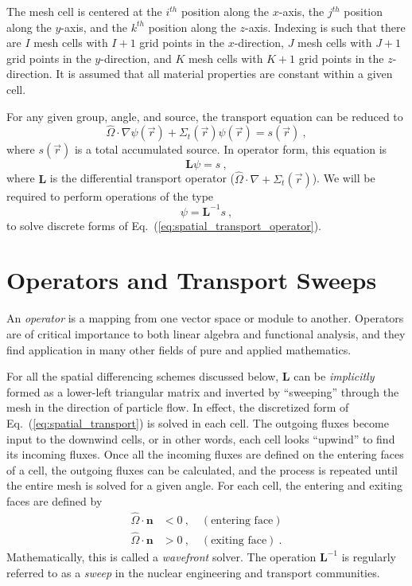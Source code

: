 \documentclass[12pt]{article}
\newcommand{\ve}[1]{\ensuremath{\mathbf{#1}}}
\newcommand{\vecr}{\ensuremath{\vec{r}}}
\newcommand{\vOmega}{\ensuremath{\hat{\Omega}}}
\begin{document}
The mesh cell is centered at the $i^{th}$ position along the $x$-axis, the $j^{th}$
position along the $y$-axis, and the  $k^{th}$ position along the $z$-axis. Indexing
is such that there are $I$ mesh cells with $I+1$ grid points in the $x$-direction, $J$ mesh
cells with $J+1$ grid points in the $y$-direction, and $K$ mesh cells with $K+1$ grid points in 
the $z$-direction. It is assumed that all material 
properties are constant within a given cell.

For any given group, angle, and source, the transport equation can be reduced to
\begin{equation}
  \vOmega\cdot\nabla\psi(\vecr) + \Sigma_t(\vecr)\psi(\vecr) =
  s(\vecr)\:,
  \label{eq:spatial_transport}
\end{equation}
where $s(\vecr)$ is a total accumulated source.  In operator form, this
equation is
\begin{equation}
  \ve{L}\psi = s\:,
  \label{eq:spatial_transport_operator}
\end{equation}
where $\ve{L}$ is the differential transport operator ($\vOmega\cdot\nabla + \Sigma_t(\vecr)$).  We will be required to perform operations of the type
\begin{equation}
  \psi = \ve{L}^{-1}s\:,
\end{equation}
to solve discrete forms of Eq.~(\ref{eq:spatial_transport_operator}).  

\section*{Operators and Transport Sweeps}

An \textit{operator} is a mapping from one vector space or module to another. Operators are of critical importance to both linear algebra and functional analysis, and they find application in many other fields of pure and applied mathematics.

For all
the spatial differencing schemes discussed below, $\ve{L}$ can be \textit{implicitly}
formed as a lower-left triangular matrix and inverted by ``sweeping'' through
the mesh in the direction of particle flow.  In effect, the discretized form
of Eq.~(\ref{eq:spatial_transport}) is solved in each cell.  The outgoing
fluxes become input to the downwind cells, or in other words, each cell looks
``upwind'' to find its incoming fluxes.  Once all the incoming fluxes are
defined on the entering faces of a cell, the outgoing fluxes can be
calculated, and the process is repeated until the entire mesh is solved for a
given angle.  For each cell, the entering and exiting faces are defined by
\begin{align}
  \vOmega\cdot\ve{n} &< 0\:,\quad (\text{entering
    face})\label{eq:entering-face}\\ \vOmega\cdot\ve{n} &> 0\:,\quad
  (\text{exiting face})\label{eq:exiting-face}\:.
\end{align}
Mathematically, this is called a \textit{wavefront} solver.  The operation
$\ve{L}^{-1}$ is regularly referred to as a \textit{sweep} in the nuclear
engineering and transport communities.  
\end{document}
